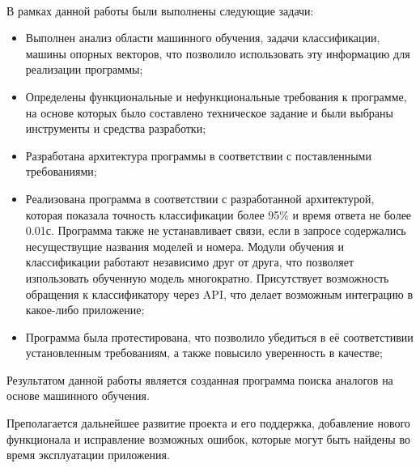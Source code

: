 \

В рамках данной работы были выполнены следующие задачи:
\begin{itemize}
  \item Выполнен анализ области машинного обучения, задачи классификации, машины опорных векторов, что позволило использовать эту информацию для реализации программы; 
  \item Определены функциональные и нефункциональные требования к программе, на основе которых было составлено техническое задание и были выбраны инструменты и средства разработки;
  \item Разработана архитектура программы в соответствии с поставленными требованиями;
  \item Реализована программа в соответствии с разработанной архитектурой, которая показала точность классификации более 95\% и время ответа не более 0.01с. Программа также не устанавливает связи, если в запросе содержались несуществущие названия моделей и номера. Модули обучения и классификации работают независимо друг от друга, что позволяет изпользовать обученную модель многократно. Присутствует возможность обращения к классификатору через API, что делает возможным интеграцию в какое-либо приложение;
  \item Программа была протестирована, что позволило убедиться в её соответстивии установленным требованиям, а также повысило уверенность в качестве;
\end{itemize}

Результатом данной работы является созданная программа поиска аналогов на основе машинного обучения.

Преполагается дальнейшее развитие проекта и его поддержка, добавление нового функционала и исправление возможных ошибок, которые могут быть найдены во время эксплуатации приложения.

\newpage
